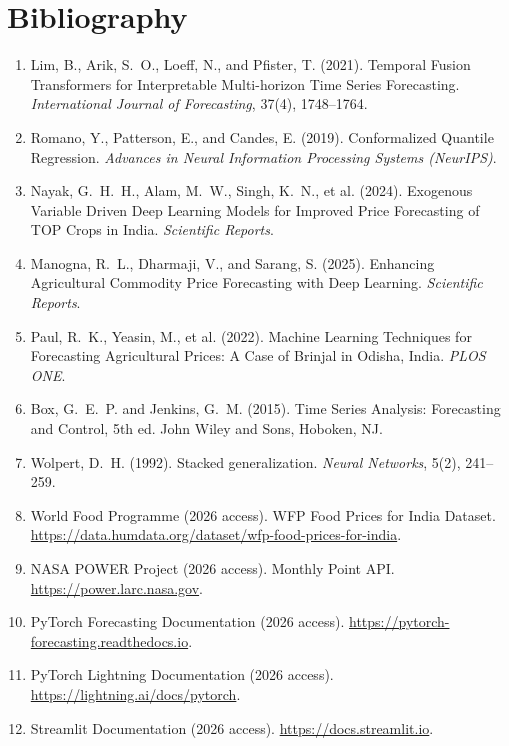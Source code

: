 \documentclass[12pt,a4paper]{report}
\begin{document}
\chapter*{Bibliography}

\begin{enumerate}
    \item Lim, B., Arik, S.~O., Loeff, N., and Pfister, T. (2021). Temporal Fusion
    Transformers for Interpretable Multi-horizon Time Series Forecasting.
    \textit{International Journal of Forecasting}, 37(4), 1748--1764.

    \item Romano, Y., Patterson, E., and Candes, E. (2019). Conformalized Quantile
    Regression. \textit{Advances in Neural Information Processing Systems (NeurIPS)}.

    \item Nayak, G.~H.~H., Alam, M.~W., Singh, K.~N., et al. (2024). Exogenous Variable
    Driven Deep Learning Models for Improved Price Forecasting of TOP Crops in India.
    \textit{Scientific Reports}.

    \item Manogna, R.~L., Dharmaji, V., and Sarang, S. (2025). Enhancing Agricultural
    Commodity Price Forecasting with Deep Learning. \textit{Scientific Reports}.

    \item Paul, R.~K., Yeasin, M., et al. (2022). Machine Learning Techniques for
    Forecasting Agricultural Prices: A Case of Brinjal in Odisha, India. \textit{PLOS ONE}.

    \item Box, G.~E.~P. and Jenkins, G.~M. (2015). Time Series Analysis: Forecasting and
    Control, 5th ed. John Wiley and Sons, Hoboken, NJ.

    \item Wolpert, D.~H. (1992). Stacked generalization. \textit{Neural Networks},
    5(2), 241--259.

    \item World Food Programme (2026 access). WFP Food Prices for India Dataset.
    \url{https://data.humdata.org/dataset/wfp-food-prices-for-india}.

    \item NASA POWER Project (2026 access). Monthly Point API.
    \url{https://power.larc.nasa.gov}.

    \item PyTorch Forecasting Documentation (2026 access).
    \url{https://pytorch-forecasting.readthedocs.io}.

    \item PyTorch Lightning Documentation (2026 access).
    \url{https://lightning.ai/docs/pytorch}.

    \item Streamlit Documentation (2026 access). \url{https://docs.streamlit.io}.
\end{enumerate}
\end{document}
